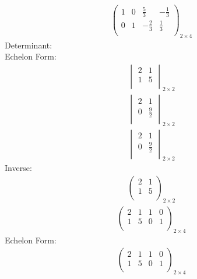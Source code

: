 \documentclass{article}
\begin{document}
\begin{align*}
\left(
\begin{array}{cc|cc}
1 & 0 & \frac{5}{3} & -\frac{1}{3}\\
0 & 1 & -\frac{2}{3} & \frac{1}{3}\\
\end{array}
\right)_{2\times 4}
\end{align*}
Determinant:\\
Echelon Form:\\
\begin{align*}
\begin{vmatrix}
2 & 1\\
1 & 5\\
\end{vmatrix}_{2\times 2}
\end{align*}
\begin{align*}
\begin{vmatrix}
2 & 1\\
0 & \frac{9}{2}\\
\end{vmatrix}_{2\times 2}
\end{align*}
\begin{align*}
\begin{vmatrix}
2 & 1\\
0 & \frac{9}{2}\\
\end{vmatrix}_{2\times 2}
\end{align*}
Inverse:\\
\begin{align*}
\begin{pmatrix}
2 & 1\\
1 & 5\\
\end{pmatrix}_{2\times 2}
\end{align*}
\begin{align*}
\left(
\begin{array}{cc|cc}
2 & 1 & 1 & 0\\
1 & 5 & 0 & 1\\
\end{array}
\right)_{2\times 4}
\end{align*}
Echelon Form:\\
\begin{align*}
\left(
\begin{array}{cc|cc}
2 & 1 & 1 & 0\\
1 & 5 & 0 & 1\\
\end{array}
\right)_{2\times 4}
\end{align*}
\end{document}
